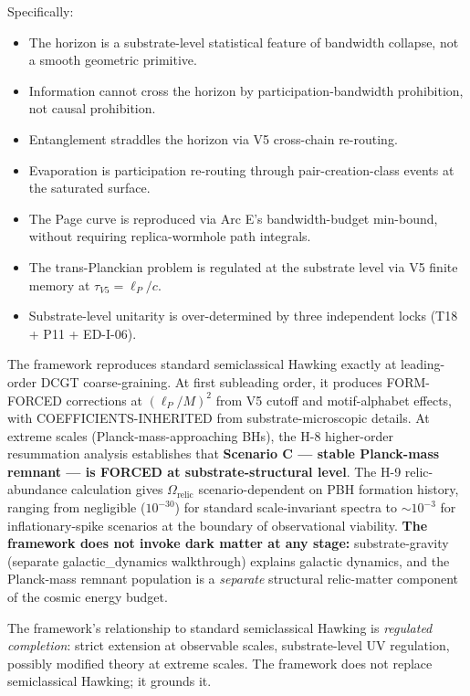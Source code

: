 \documentclass[11pt,a4paper]{article}
\begin{document}
Specifically:
\begin{itemize}[noitemsep]
  \item The horizon is a substrate-level statistical feature of bandwidth collapse, not a smooth geometric primitive.
  \item Information cannot cross the horizon by participation-bandwidth prohibition, not causal prohibition.
  \item Entanglement straddles the horizon via V5 cross-chain re-routing.
  \item Evaporation is participation re-routing through pair-creation-class events at the saturated surface.
  \item The Page curve is reproduced via Arc E's bandwidth-budget min-bound, without requiring replica-wormhole path integrals.
  \item The trans-Planckian problem is regulated at the substrate level via V5 finite memory at $\tau_{V5} = \ell_P/c$.
  \item Substrate-level unitarity is over-determined by three independent locks (T18 + P11 + ED-I-06).
\end{itemize}

The framework reproduces standard semiclassical Hawking exactly at leading-order DCGT coarse-graining. At first subleading order, it produces FORM-FORCED corrections at $(\ell_P/M)^2$ from V5 cutoff and motif-alphabet effects, with COEFFICIENTS-INHERITED from substrate-microscopic details. At extreme scales (Planck-mass-approaching BHs), the H-8 higher-order resummation analysis establishes that \textbf{Scenario C --- stable Planck-mass remnant --- is FORCED at substrate-structural level}. The H-9 relic-abundance calculation gives $\Omega_{\mathrm{relic}}$ scenario-dependent on PBH formation history, ranging from negligible ($10^{-30}$) for standard scale-invariant spectra to $\sim 10^{-3}$ for inflationary-spike scenarios at the boundary of observational viability. \textbf{The framework does not invoke dark matter at any stage:} substrate-gravity (separate galactic\_dynamics walkthrough) explains galactic dynamics, and the Planck-mass remnant population is a \emph{separate} structural relic-matter component of the cosmic energy budget.

The framework's relationship to standard semiclassical Hawking is \emph{regulated completion}: strict extension at observable scales, substrate-level UV regulation, possibly modified theory at extreme scales. The framework does not replace semiclassical Hawking; it grounds it.
\end{document}
